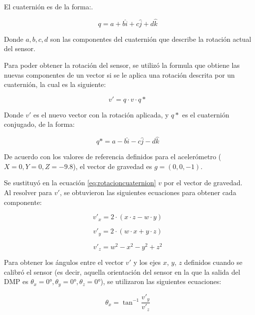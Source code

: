 El cuaternión es de la forma:.

\begin{equation}
	q = a + b\hat{i} + c\hat{j} + d\hat{k}
	\label{eq:eqcuaternion}
\end{equation}

Donde $a, b, c, d$ son las componentes del cuaternión que describe la rotación actual del sensor.

Para poder obtener la rotación del sensor, se utilizó la formula que obtiene las nuevas componentes de un vector si se le aplica una rotación descrita por un cuaternión, la cual es la siguiente:

\begin{equation}
	v' = q\cdot v\cdot q*
	\label{eq:rotacioncuaternion}
\end{equation}

Donde $v'$ es el nuevo vector con la rotación aplicada, y $q*$ es el cuaternión conjugado, de la forma:

\begin{equation}
	q* = a - b\hat{i} - c\hat{j} - d\hat{k}
	\label{eq:eqcuaternionconj}
\end{equation}

De acuerdo con los valores de referencia definidos para el acelerómetro ($X=0, Y=0, Z=-9.8$), el vector de gravedad es $g = (0, 0, -1)$.

Se sustituyó en la ecuación \ref{eq:rotacioncuaternion} $v$ por el vector de gravedad. Al resolver para $v'$, se obtuvieron las siguientes ecuaciones para obtener cada componente:

\begin{equation}
	v'_x = 2\cdot(x \cdot z - w \cdot y)
	\label{eq:componentex}
\end{equation}

\begin{equation}
	v'_y = 2\cdot(w \cdot x + y \cdot z)
	\label{eq:componentey}
\end{equation}

\begin{equation}
	v'_z = w^2 - x^2 - y^2 + z^2
	\label{eq:componentez}
\end{equation}

Para obtener los ángulos entre el vector $v'$ y los ejes $x$, $y$, $z$ definidos cuando se calibró el sensor (es decir, aquella orientación del sensor en la que la salida del DMP es $\theta_x = 0°,\theta_y = 0°,\theta_z = 0°$), se utilizaron las siguientes ecuaciones:

\begin{equation}
	\theta_x = \tan^{-1}\frac{v'_y}{v'_z}
	\label{eq:angulox}
\end{equation}

